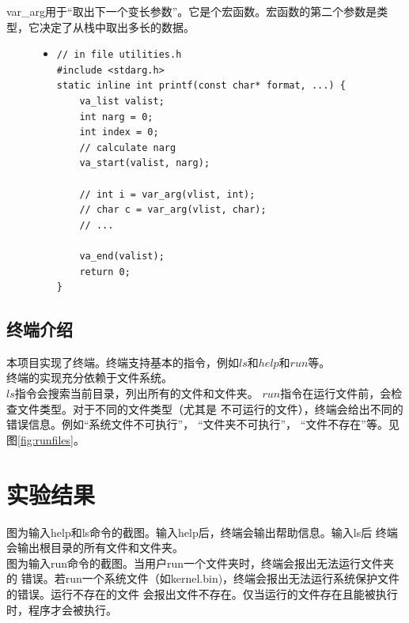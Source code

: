 \documentclass[a4paper]{article}
\begin{document}
    var\_arg用于``取出下一个变长参数''。它是个宏函数。宏函数的第二个参数是类型，它决定了从栈中取出多长的数据。
    \begin{figure}[!hbt]
    \begin{itemize}
    \item[] \begin{lstlisting}[style=mystyle, label=lst:printf, caption=printf实现代码主要部分]
// in file utilities.h    
#include <stdarg.h>
static inline int printf(const char* format, ...) {
    va_list valist;
    int narg = 0;
    int index = 0;
    // calculate narg
    va_start(valist, narg);

    // int i = var_arg(vlist, int);
    // char c = var_arg(vlist, char);
    // ...

    va_end(valist);
    return 0;
}
    \end{lstlisting}
    \end{itemize}
    \end{figure}

    \subsection{终端介绍}
    本项目实现了终端。终端支持基本的指令，例如$ls$和$help$和$run$等。\\
    
    终端的实现充分依赖于文件系统。\\
    $ls$指令会搜索当前目录，列出所有的文件和文件夹。
    $run$指令在运行文件前，会检查文件类型。对于不同的文件类型（尤其是
    不可运行的文件），终端会给出不同的错误信息。例如``系统文件不可执行''， 
    ``文件夹不可执行''， ``文件不存在''等。见图\ref{fig:runfiles}。
\section{实验结果} 
    图\label{fig:helpls}为输入help和ls命令的截图。输入help后，终端会输出帮助信息。输入ls后
    终端会输出根目录的所有文件和文件夹。\\
    
    图\label{fig:runfiles}为输入run命令的截图。当用户run一个文件夹时，终端会报出无法运行文件夹的
    错误。若run一个系统文件（如kernel.bin)，终端会报出无法运行系统保护文件的错误。运行不存在的文件
    会报出文件不存在。仅当运行的文件存在且能被执行时，程序才会被执行。
\end{document}
